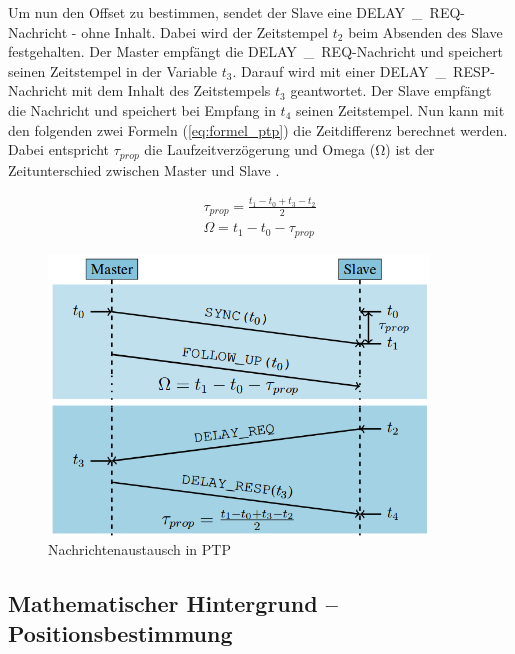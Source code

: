 Um nun den Offset zu bestimmen, sendet der Slave eine \si{DELAY\_REQ}-Nachricht - ohne Inhalt. Dabei wird der Zeitstempel $t_{2}$ beim Absenden des Slave festgehalten. Der Master empfängt die \si{DELAY\_REQ}-Nachricht und speichert seinen Zeitstempel in der Variable $t_{3}$. Darauf wird mit einer \si{DELAY\_RESP}-Nachricht mit dem Inhalt des Zeitstempels $t_{3}$ geantwortet. Der Slave empfängt die Nachricht und speichert bei Empfang in $t_{4}$ seinen Zeitstempel. Nun kann mit den folgenden zwei Formeln (\ref{eq:formel_ptp}) die Zeitdifferenz berechnet werden. Dabei entspricht $\tau_{prop}$ die Laufzeitverzögerung und Omega (\si{\ohm}) ist der Zeitunterschied zwischen Master und Slave \cite{src_PTP}.

\begin{equation}\label{eq:formel_ptp}
\begin{split}
\tau_{prop} = \frac{t_{1} - t_{0} + t_{3} - t_{2}}{2}
\\
\Omega = t_{1} - t_{0} - \tau_{prop}
\end{split}
\end{equation}

\begin{figure}[H]
        \centering
        \includegraphics[width=0.9\textwidth]{images/ptp.png}
        \caption{Nachrichtenaustausch in PTP}
        \label{img:ptp}
\end{figure}

\subsection{Mathematischer Hintergrund -- Positionsbestimmung}

